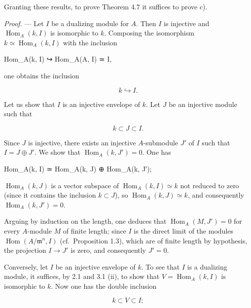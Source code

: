 \documentclass[
]{article}
\newenvironment{Shaded}{}{}
\newcommand{\NormalTok}[1]{#1}
\begin{document}
Granting these results, to prove Theorem 4.7 it suffices to prove c).

\emph{Proof.} --- Let \(I\) be a dualizing module for \(A\). Then \(I\)
is injective and \(\operatorname{Hom}_{A}(k, I)\) is isomorphic to
\(k\). Composing the isomorphism
\(k \simeq \operatorname{Hom}_{A}(k, I)\) with the inclusion

\begin{Shaded}
\begin{Highlighting}[]
\NormalTok{Hom\_A(k, I) ↪ Hom\_A(A, I) ≃ I,}
\end{Highlighting}
\end{Shaded}

one obtains the inclusion

\[
k \hookrightarrow I.
\]

Let us show that \(I\) is an injective envelope of \(k\). Let \(J\) be
an injective module such that

\[
k \subset J \subset I.
\]

Since \(J\) is injective, there exists an injective \(A\)-submodule
\(J'\) of \(I\) such that \(I = J \oplus J'\). We show that
\(\operatorname{Hom}_{A}(k, J') = 0\). One has

\begin{Shaded}
\begin{Highlighting}[]
\NormalTok{Hom\_A(k, I) ≃ Hom\_A(k, J) ⊕ Hom\_A(k, J′);}
\end{Highlighting}
\end{Shaded}

\(\operatorname{Hom}_{A}(k, J)\) is a vector subspace of
\(\operatorname{Hom}_{A}(k, I) \simeq k\) not reduced to zero (since it
contains the inclusion \(k \subset J\)), so
\(\operatorname{Hom}_{A}(k, J) \simeq k\), and consequently
\(\operatorname{Hom}_{A}(k, J') = 0\).

Arguing by induction on the length, one deduces that
\(\operatorname{Hom}_{A}(M, J') = 0\) for every \(A\)-module \(M\) of
finite length; since \(I\) is the direct limit of the modules
\(\operatorname{Hom}(A/\mathfrak{m}^{n}, I)\) (cf.~Proposition 1.3),
which are of finite length by hypothesis, the projection \(I \to J'\) is
zero, and consequently \(J' = 0\).

Conversely, let \(I\) be an injective envelope of \(k\). To see that
\(I\) is a dualizing module, it suffices, by 2.1 and 3.1 (ii), to show
that \(V = \operatorname{Hom}_{A}(k, I)\) is isomorphic to \(k\). Now
one has the double inclusion

\[
k \subset V \subset I;
\]
\end{document}
